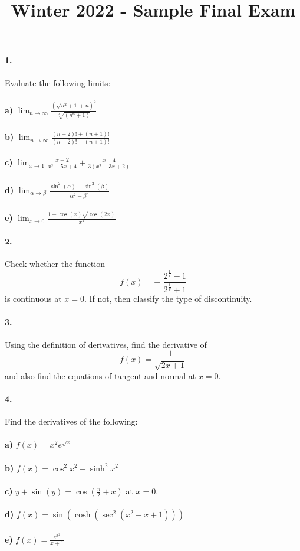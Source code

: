 \documentclass[12pt]{article}
\title{Winter 2022 - Sample Final Exam}
\begin{document}
\maketitle
	\paragraph{1.}
	Evaluate the following limits:
	\\
	\\
	\textbf{a)} $ \displaystyle \lim_{n \to \infty} \frac{(\sqrt{n^2+1}+n)^2}{\sqrt[3]{(n^6+1)}}$\\
	\\
	\textbf{b)} $ \displaystyle \lim_{n \to \infty} \frac{(n+2)! + (n+1)!}{(n+2)! - (n+1)!}$\\
	\\
	\textbf{c)} $ \displaystyle \lim_{x \to 1} \frac{x+2}{x^2-5x+4} + \frac{x-4}{3(x^2-3x+2)}$\\
	\\
	\textbf{d)} $ \displaystyle \lim_{\alpha \to \beta} \frac{\sin^2(\alpha)-\sin^2(\beta)}{\alpha^2 - \beta^2}$\\
	\\
	\textbf{e)} $ \displaystyle \lim_{x \to 0} \frac{1-\cos(x)\sqrt{\cos(2x)}}{x^2}$\\
	
	\paragraph{2.}
	Check whether the function
	\textit{
	$$f(x) = - \hspace{4pt}\frac{2^\frac{1}{x}-1}{2^\frac{1}{x}+1}$$
	}
	\hspace{12pt} is continuous at $x=0$. If not, then classify the type of discontinuity.
	
	\paragraph{3.}
	Using the definition of derivatives, find the derivative of
	$$f(x) =  \frac{1}{\sqrt{2x+1}} $$
	\hspace{16pt} and also find the equations of tangent and normal at $x=0$.
	
	\paragraph{4.}
	Find the derivatives of the following:
	\\
	\\
	\textbf{a)} $ \displaystyle f(x)=x^2e^{\sqrt{x}}$\\
	\\
	\textbf{b)} $ \displaystyle f(x) = \cos^2{x^2}+\sinh^2{x^2}$\\
	\\
	\textbf{c)} $ \displaystyle y+\sin(y)=\cos(\frac{\pi}{2}+x)$ at $x=0$.\\
	\\
	\textbf{d)} $ \displaystyle f(x)=\sin(\cosh(\sec^2(x^2+x+1)))$\\
	\\
	\textbf{e)} $ \displaystyle f(x)=\frac{e^{x^2}}{x+1}$\\
	
\end{document}
